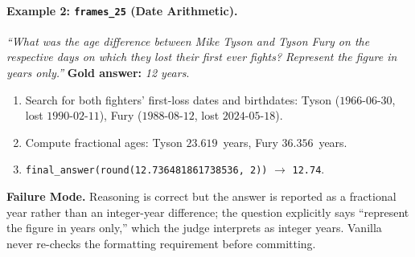 \paragraph{Example 2: \texttt{frames\_25} (Date Arithmetic).}
\textit{``What was the age difference between Mike Tyson and Tyson Fury on the respective days on which they lost their first ever fights? Represent the figure in years only.''} \textbf{Gold answer:} \emph{12 years}.

\begin{tcolorbox}[colback=red!4, colframe=red!60!black, title=\textsc{Vanilla} (Pred: 12.74 / GT: 12), fontupper=\small, breakable]
\begin{enumerate}
\setcounter{enumi}{0}
  \item[1-4.] Search for both fighters' first-loss dates and birthdates: Tyson ($1966$-$06$-$30$, lost $1990$-$02$-$11$), Fury ($1988$-$08$-$12$, lost $2024$-$05$-$18$).
  \item[5-6.] Compute fractional ages: Tyson $23.619$~years, Fury $36.356$~years.
  \item[7.] \texttt{final\_answer(round(12.736481861738536, 2))} $\rightarrow$ \texttt{12.74}.
\end{enumerate}
\textbf{Failure Mode.} Reasoning is correct but the answer is reported as a fractional year rather than an integer-year difference; the question explicitly says ``represent the figure in years only,'' which the judge interprets as integer years. Vanilla never re-checks the formatting requirement before committing.
\end{tcolorbox}

